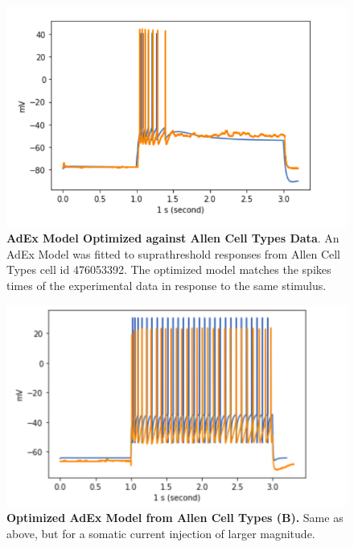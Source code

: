 \begin{figure}
    \centering
    \includegraphics[scale=1]{figures/adexp_fit_allen_spec_id_476053392.png}
    \caption[Optimized AdEx Model from Allen Cell Types (A)]{\textbf{AdEx Model Optimized against Allen Cell Types Data}.
    An AdEx Model was fitted to suprathreshold responses from Allen Cell Types cell id 476053392.
    The optimized model matches the spikes times of the experimental data in response to the same stimulus.}
    \label{fig:specimen_476053392_A}
\end{figure}

\begin{figure}
    \centering
    \includegraphics[scale=1]{figures/28spikesB95}
    \caption[Optimized AdEx Model from Allen Cell Types (B)]{\textbf{Optimized AdEx Model from Allen Cell Types (B).} Same as above, but for a somatic current injection of larger magnitude.}
    \label{fig:specimen_476053392_B}
\end{figure}

